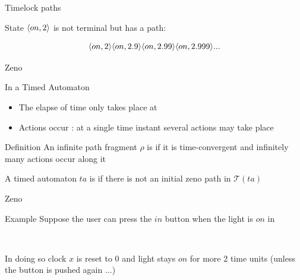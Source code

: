 \documentclass[aspectratio=169]{beamer}
\def\TL#1{\mathcal{T}(#1)}
\begin{document}
\begin{slide}{Timelock paths}
\small


\begin{center}
\end{center}

State $\mathopen{\langle}on,2\mathclose{\rangle}$ is not terminal but has a  path:

$$\mathopen{\langle}on,2\mathclose{\rangle} \mathopen{\langle}on,2.9\mathclose{\rangle}  \mathopen{\langle}on,2.99\mathclose{\rangle}  \mathopen{\langle}on,2.999\mathclose{\rangle}  ...$$

\end{slide}



\begin{slide}{Zeno}
\small

\begin{block}{In a Timed Automaton}
\begin{itemize}
\item The elapse of time only takes place at 
\item Actions occur : at a single time instant several actions may take place
\end{itemize}

\end{block}

\pause
\begin{block}{Definition}
An infinite path fragment $\rho$ is  if it is \alert{time-convergent} and
\alert{infinitely many actions occur along it}



A timed automaton $ta$ is  if there is not an initial zeno path in $\TL{ta}$
\end{block}

\end{slide}


\begin{slide}{Zeno}
\small


\begin{block}{Example}
Suppose the user can press the $in$ button when the light is $on$ in
\begin{figure}[htb]
  \centering
  \\
\end{figure}
In doing so clock $x$ is reset to 0 and light stays $on$ for more 2 time units (unless the button is pushed again ...)
\end{block}

\end{slide}
\end{document}
